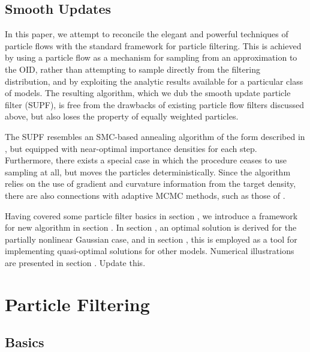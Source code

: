 \documentclass{statsoc}
\begin{document}
\subsection{Smooth Updates}

In this paper, we attempt to reconcile the elegant and powerful techniques of particle flows with the standard framework for particle filtering. This is achieved by using a particle flow as a mechanism for sampling from an approximation to the OID, rather than attempting to sample directly from the filtering distribution, and by exploiting the analytic results available for a particular class of models. The resulting algorithm, which we dub the smooth update particle filter (SUPF), is free from the drawbacks of existing particle flow filters discussed above, but also loses the property of equally weighted particles.

The SUPF resembles an SMC-based annealing algorithm of the form described in \citep{DelMoral2006}, but equipped with near-optimal importance densities for each step. Furthermore, there exists a special case in which the procedure ceases to use sampling at all, but moves the particles deterministically. Since the algorithm relies on the use of gradient and curvature information from the target density, there are also connections with adaptive MCMC methods, such as those of \citep{Girolami2011}.

Having covered some particle filter basics in section , we introduce a framework for new algorithm in section . In section , an optimal solution is derived for the partially nonlinear Gaussian case, and in section , this is employed as a tool for implementing quasi-optimal solutions for other models. Numerical illustrations are presented in section . {\meta Update this.}



\section{Particle Filtering}

\subsection{Basics}
\end{document}
